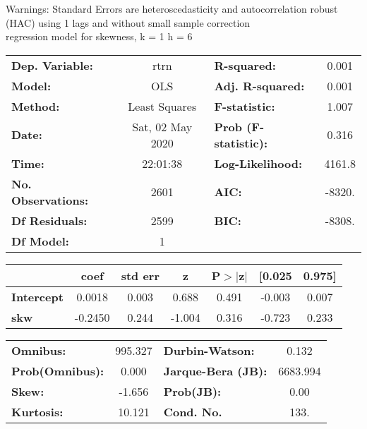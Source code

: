Warnings: \newline
 [1] Standard Errors are heteroscedasticity and autocorrelation robust (HAC) using 1 lags and without small sample correction\\ 

regression model for skewness, k = 1 h = 6\begin{center}
\begin{tabular}{lclc}
\toprule
\textbf{Dep. Variable:}    &       rtrn       & \textbf{  R-squared:         } &     0.001   \\
\textbf{Model:}            &       OLS        & \textbf{  Adj. R-squared:    } &     0.001   \\
\textbf{Method:}           &  Least Squares   & \textbf{  F-statistic:       } &     1.007   \\
\textbf{Date:}             & Sat, 02 May 2020 & \textbf{  Prob (F-statistic):} &    0.316    \\
\textbf{Time:}             &     22:01:38     & \textbf{  Log-Likelihood:    } &    4161.8   \\
\textbf{No. Observations:} &        2601      & \textbf{  AIC:               } &    -8320.   \\
\textbf{Df Residuals:}     &        2599      & \textbf{  BIC:               } &    -8308.   \\
\textbf{Df Model:}         &           1      & \textbf{                     } &             \\
\bottomrule
\end{tabular}
\begin{tabular}{lcccccc}
                   & \textbf{coef} & \textbf{std err} & \textbf{z} & \textbf{P$> |$z$|$} & \textbf{[0.025} & \textbf{0.975]}  \\
\midrule
\textbf{Intercept} &       0.0018  &        0.003     &     0.688  &         0.491        &       -0.003    &        0.007     \\
\textbf{skw}       &      -0.2450  &        0.244     &    -1.004  &         0.316        &       -0.723    &        0.233     \\
\bottomrule
\end{tabular}
\begin{tabular}{lclc}
\textbf{Omnibus:}       & 995.327 & \textbf{  Durbin-Watson:     } &    0.132  \\
\textbf{Prob(Omnibus):} &   0.000 & \textbf{  Jarque-Bera (JB):  } & 6683.994  \\
\textbf{Skew:}          &  -1.656 & \textbf{  Prob(JB):          } &     0.00  \\
\textbf{Kurtosis:}      &  10.121 & \textbf{  Cond. No.          } &     133.  \\
\bottomrule
\end{tabular}
\end{center}

